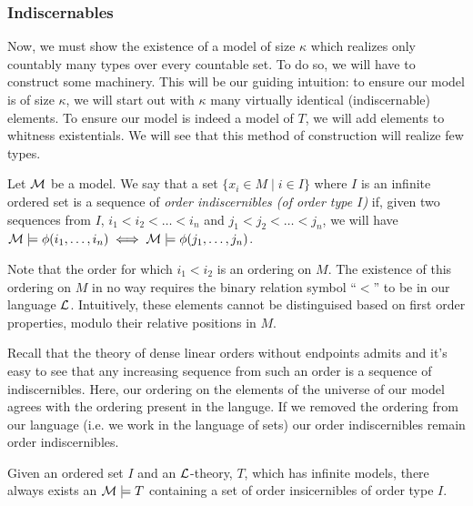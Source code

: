 \subsubsection{Indiscernables}
Now, we must show the existence of a model of size \(\kappa\) which realizes only countably many types over every countable set. 
To do so, we will have to construct some machinery.
This will be our guiding intuition: to ensure our model is of size \(\kappa\), we will start out with \(\kappa\) many virtually identical (indiscernable) elements. 
To ensure our model is indeed a model of \(T\), we will add elements to whitness existentials. 
We will see that this method of construction will realize few types.

\begin{definition}\label{definition_order_indiscernibles}
Let \(\mathcal{M}\) be a model.
We say that a set \(\{x_i \in M \mid i \in I\}\) where \(I\) is an infinite ordered set is a sequence of \textit{order indiscernibles (of order type \(I\))} if, given two sequences from \(I\), 
\(i_1 < i_2 < \ldots < i_n\) and \(j_1 < j_2 < \ldots < j_n\), we will have \(\mathcal{M} \models \phi(i_1, \ldots, i_n) \iff \mathcal{M} \models \phi(j_1, \ldots, j_n)\).  
\end{definition}

Note that the order for which \(i_1 < i_2\) is an ordering on \(M\).
The existence of this ordering on \(M\) in no way requires the binary relation symbol ``\(<\)'' to be in our language \(\mathcal{L}\). 
Intuitively, these elements cannot be distinguised based on first order properties, modulo their relative positions in \(M\). 

Recall that the theory of dense linear orders without endpoints admits \qe \cite{mar} and it's easy to see that any increasing sequence from such an order is a sequence of indiscernibles. 
Here, our ordering on the elements of the universe of our model agrees with the ordering present in the languge. 
If we removed the ordering from our language (i.e. we work in the language of sets) our order indiscernibles remain order indiscernibles. 

\begin{theorem}\label{theorem_order_indiscernibles}
Given an ordered set \(I\) and an \(\mathcal{L}\)-theory, \(T\), which has infinite models, there always exists an \(\mathcal{M} \models T\) containing a set of order insicernibles of order type \(I\). 
\end{theorem}

